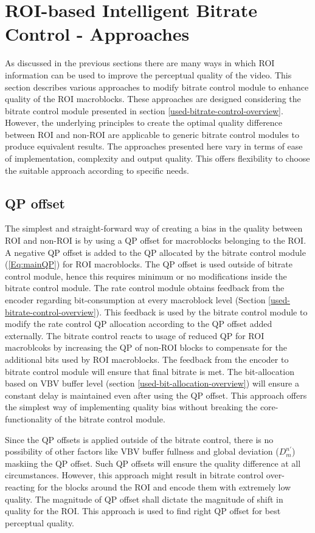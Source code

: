 \documentclass[11pt]{article} %
\begin{document}
\section{ROI-based Intelligent Bitrate Control - Approaches}
As discussed in the previous sections there are many ways in which ROI information can be used to improve the perceptual quality of the video. This section describes various approaches to modify bitrate control module to enhance quality of the ROI macroblocks. These approaches are designed considering the bitrate control module presented in section \ref{used-bitrate-control-overview}. However, the underlying principles to create the optimal quality difference between ROI and non-ROI are applicable to generic bitrate control modules to produce equivalent results. The approaches presented here vary in terms of ease of implementation, complexity and output quality. This offers flexibility to choose the suitable approach according to specific needs.
\subsection{QP offset}
The simplest and straight-forward way of creating a bias in the quality between ROI and non-ROI is by using a QP offset for macroblocks belonging to the ROI. A negative QP offset is added to the QP allocated by the bitrate control module (\ref{Eq:mainQP}) for ROI macroblocks. The QP offset is used outside of bitrate control module, hence this requires minimum or no modifications inside the bitrate control module. The rate control module obtains feedback from the encoder regarding bit-consumption at every macroblock level (Section \ref{used-bitrate-control-overview}). This feedback is used by the bitrate control module to modify the rate control QP allocation according to the QP offset added externally. The bitrate control reacts to usage of reduced QP for ROI macroblcoks by increasing the QP of non-ROI blocks to compensate for the additional bits used by ROI macroblocks. The feedback from the encoder to bitrate control module will ensure that final bitrate is met. The bit-allocation based on VBV buffer level (section \ref{used-bit-allocation-overview}) will ensure a constant delay is maintained even after using the QP offset. This approach offers the simplest way of implementing quality bias without breaking the core-functionality of the bitrate control module. 

Since the QP offsets is applied outside of the bitrate control, there is no possibility of other factors like VBV buffer fullness and global deviation ($D_m^{n'}$) maskiing the QP offset. Such QP offsets will ensure the quality difference at all circumstances. However, this approach might result in bitrate control over-reacting for the blocks around the ROI and encode them with extremely low quality. The magnitude of QP offset shall dictate the magnitude of shift in quality for the ROI. This approach is used to find right QP offset for best perceptual quality. 
\end{document}
